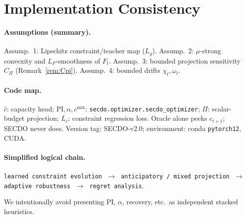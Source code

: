 \section{Implementation Consistency}
\label{app:impl}

\paragraph{Assumptions (summary).}
Assump.~1: Lipschitz constraint/teacher map ($L_g$).
Assump.~2: $\mu$-strong convexity and $L_F$-smoothness of $F_t$.
Assump.~3: bounded projection sensitivity $C_\Pi$ (Remark~\ref{rem:Cpi}).
Assump.~4: bounded drifts $\chi_t,\omega_t$.

\paragraph{Code map.}
$\hat c$: capacity head;
$\mathrm{PI},\alpha,c^{\mathrm{mix}}$: \texttt{secdo.optimizer.secdo\_optimizer};
$\Pi$: scalar-budget projection;
$L_c$: constraint regression loss.
Oracle alone peeks $c_{t+1}$; SECDO never does.
Version tag: SECDO-v2.0; environment: conda \texttt{pytorch12}, CUDA.

\paragraph{Simplified logical chain.}
\begin{center}
\texttt{learned constraint evolution}
$\;\rightarrow\;$
\texttt{anticipatory / mixed projection}
$\;\rightarrow\;$
\texttt{adaptive robustness}
$\;\rightarrow\;$
\texttt{regret analysis}.
\end{center}
We intentionally avoid presenting PI, $\alpha$, recovery, etc.\ as independent stacked heuristics.

